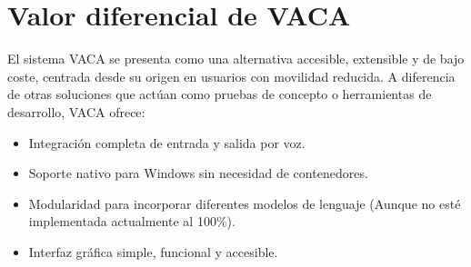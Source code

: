 \begin{table}[H]
	\centering
	\renewcommand{\arraystretch}{1.5}
	\caption{Comparativa entre VACA y otras herramientas de asistencia basadas en modelos de lenguaje}
	\label{tab:comparativa_vaca}
\end{table}

\section{Valor diferencial de VACA}

El sistema VACA se presenta como una alternativa accesible, extensible y de bajo coste, centrada desde su origen en usuarios con movilidad reducida. A diferencia de otras soluciones que actúan como pruebas de concepto o herramientas de desarrollo, VACA ofrece:

\begin{itemize}
    \item Integración completa de entrada y salida por voz.
    \item Soporte nativo para Windows sin necesidad de contenedores.
    \item Modularidad para incorporar diferentes modelos de lenguaje (Aunque no esté implementada actualmente al 100\%).
    \item Interfaz gráfica simple, funcional y accesible.
\end{itemize}

